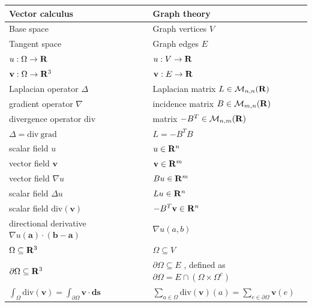 \begin{table}[ht]
\begin{tabular}{l|l}
	
		Vector calculus&
		Graph theory\\\hline
	
		Base space&
		Graph vertices $V$\\
	
		Tangent space&
		Graph edges $E$\\
	
		$u:\Omega\to\mathbf{R}$&
		$u:V\to\mathbf{R}$\\
	
		$\mathbf{v}:\Omega\to\mathbf{R}^3$&
		$\mathbf{v}:E\to\mathbf{R}$\\
	
		Laplacian operator $\Delta$&
		Laplacian matrix $L\in\mathcal{M}_{n,n}(\mathbf{R})$\\
	
		gradient operator $\nabla$&
		incidence matrix $B\in\mathcal{M}_{m,n}(\mathbf{R})$\\
	
		divergence operator $\mathrm{div}$&
		matrix $-B^T\in\mathcal{M}_{n,m}(\mathbf{R})$\\
	
		$\Delta=\mathrm{div\ grad}$&
		$L=-B^T B$\\
	
		scalar field $u$&
		$u\in\mathbf{R}^n$\\
	
		vector field $\mathbf{v}$&
		$\mathbf{v}\in\mathbf{R}^m$\\
	
		vector field $\nabla u$&
		$Bu\in\mathbf{R}^m$\\
	
		scalar field $\Delta u$&
		$Lu\in\mathbf{R}^n$\\
	
		scalar field $\mathrm{div}(\mathbf{v})$&
		$-B^T\mathbf{v}\in\mathbf{R}^n$\\
	
		directional derivative $\nabla
			u(\mathbf{a})\cdot(\mathbf{b}-\mathbf{a})$&
		$\nabla u (a,b)$\\
	
		$\Omega\subseteq\mathbf{R}^3$&
		$\Omega\subseteq V$\\
	
		$\partial\Omega\subseteq\mathbf{R}^3$&
		$\partial\Omega\subseteq E$ ,
			defined as $\partial\Omega=E\cap(\Omega\times\Omega^c)$\\
	
		$\displaystyle\int_\Omega\mathrm{div}(\mathbf{v})
			=
			\int_{\partial\Omega}\mathbf{v\cdot ds}$&
		$\displaystyle\sum_{a\in\Omega}\mathrm{div}(\mathbf{v})(a)
			=
			\sum_{e\in\partial\Omega}\mathbf{v}(e)$\\
	

\end{tabular}
\end{table}
